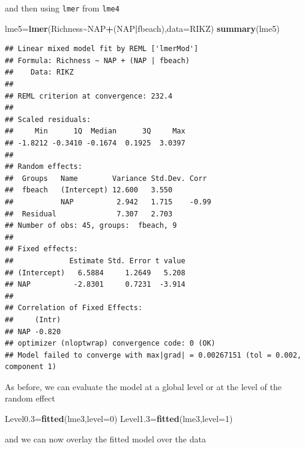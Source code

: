 \documentclass[
]{book}
\newenvironment{Shaded}{\begin{snugshade}}{\end{snugshade}}
\newcommand{\AttributeTok}[1]{\textcolor[rgb]{0.13,0.29,0.53}{#1}}
\newcommand{\DecValTok}[1]{\textcolor[rgb]{0.00,0.00,0.81}{#1}}
\newcommand{\FloatTok}[1]{\textcolor[rgb]{0.00,0.00,0.81}{#1}}
\newcommand{\FunctionTok}[1]{\textcolor[rgb]{0.13,0.29,0.53}{\textbf{#1}}}
\newcommand{\NormalTok}[1]{#1}
\newcommand{\OtherTok}[1]{\textcolor[rgb]{0.56,0.35,0.01}{#1}}
\newcommand{\SpecialCharTok}[1]{\textcolor[rgb]{0.81,0.36,0.00}{\textbf{#1}}}
\begin{document}
and then using \texttt{lmer} from \texttt{lme4}

\begin{Shaded}
\begin{Highlighting}[]
\NormalTok{lme5}\OtherTok{=}\FunctionTok{lmer}\NormalTok{(Richness}\SpecialCharTok{\textasciitilde{}}\NormalTok{NAP}\SpecialCharTok{+}\NormalTok{(NAP}\SpecialCharTok{|}\NormalTok{fbeach),}\AttributeTok{data=}\NormalTok{RIKZ)}
\FunctionTok{summary}\NormalTok{(lme5)}
\end{Highlighting}
\end{Shaded}

\begin{verbatim}
## Linear mixed model fit by REML ['lmerMod']
## Formula: Richness ~ NAP + (NAP | fbeach)
##    Data: RIKZ
## 
## REML criterion at convergence: 232.4
## 
## Scaled residuals: 
##     Min      1Q  Median      3Q     Max 
## -1.8212 -0.3410 -0.1674  0.1925  3.0397 
## 
## Random effects:
##  Groups   Name        Variance Std.Dev. Corr 
##  fbeach   (Intercept) 12.600   3.550         
##           NAP          2.942   1.715    -0.99
##  Residual              7.307   2.703         
## Number of obs: 45, groups:  fbeach, 9
## 
## Fixed effects:
##             Estimate Std. Error t value
## (Intercept)   6.5884     1.2649   5.208
## NAP          -2.8301     0.7231  -3.914
## 
## Correlation of Fixed Effects:
##     (Intr)
## NAP -0.820
## optimizer (nloptwrap) convergence code: 0 (OK)
## Model failed to converge with max|grad| = 0.00267151 (tol = 0.002, component 1)
\end{verbatim}

As before, we can evaluate the model at a global level or at the level of the random effect

\begin{Shaded}
\begin{Highlighting}[]
\NormalTok{Level0}\FloatTok{.3}\OtherTok{=}\FunctionTok{fitted}\NormalTok{(lme3,}\AttributeTok{level=}\DecValTok{0}\NormalTok{)}
\NormalTok{Level1}\FloatTok{.3}\OtherTok{=}\FunctionTok{fitted}\NormalTok{(lme3,}\AttributeTok{level=}\DecValTok{1}\NormalTok{)}
\end{Highlighting}
\end{Shaded}

and we can now overlay the fitted model over the data
\end{document}
